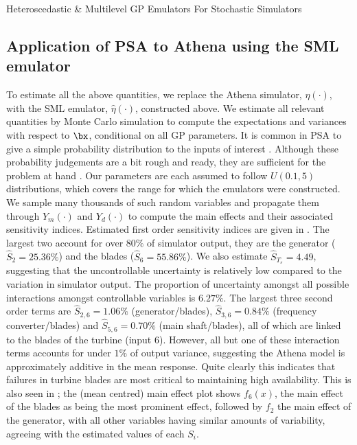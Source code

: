 \begin{chapter}{Heteroscedastic \& Multilevel GP Emulators For Stochastic Simulators\label{Ch:Hetsml}}
\subsection{Application of PSA to Athena using the SML emulator}

To estimate all the above quantities, we replace the Athena simulator, $\eta(\cdot)$, with the SML emulator, $\hat{\eta}(\cdot)$, constructed above. We estimate all relevant quantities by Monte Carlo simulation to compute the expectations and variances with respect to $\bx$, conditional on all GP parameters. It is common in PSA to give a simple probability distribution to the inputs of interest \citep{Kennedy2006,Saisana2005,Overstall2016}. Although these probability judgements are a bit rough and ready, they are sufficient for the problem at hand \citep{Ohagan2019}. Our parameters are each assumed to follow $U(0.1, 5)$ distributions, which covers the range for which the emulators were constructed. We sample many thousands of such random variables and propagate them through $Y_m(\cdot)$ and $Y_d(\cdot)$ to compute the main effects and their associated sensitivity indices. Estimated first order sensitivity indices are given in . The largest two account for over $80\%$ of simulator output, they are the generator ($\hat{S}_2 = 25.36\%$) and the blades ($\hat{S}_6 = 55.86\%$). We also estimate $\hat{S}_{T_\varepsilon} = 4.49$, suggesting that the uncontrollable uncertainty is relatively low compared to the variation in simulator output. The proportion of uncertainty amongst all possible interactions amongst controllable variables is $6.27\%$. The largest three second order terms are $\hat{S}_{2,6} = 1.06\%$ (generator/blades), $\hat{S}_{3,6} = 0.84\%$ (frequency converter/blades) and $\hat{S}_{5,6} = 0.70\%$ (main shaft/blades), all of which are linked to the blades of the turbine (input $6$). However, all but one of these interaction terms accounts for under $1\%$ of output variance, suggesting the Athena model is approximately additive in the mean response. Quite clearly this indicates that failures in turbine blades are most critical to maintaining high availability. This is also seen in ; the (mean centred) main effect plot shows $f_6(x)$, the main effect of the blades as being the most prominent effect, followed by $f_2$ the main effect of the generator, with all other variables having similar amounts of variability, agreeing with the estimated values of each $S_i$.
\begin{table}[h]
	\centering


\end{table}
\end{chapter}
